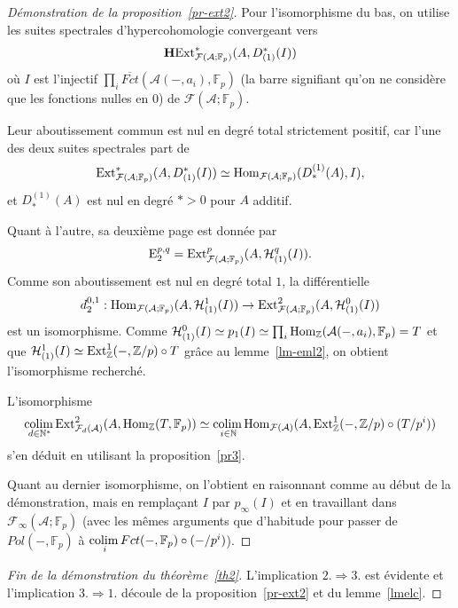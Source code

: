 \documentclass[a4paper,10pt]{article}
\newcommand{\A}{{\mathcal{A}}}
\newcommand{\F}{{\mathcal{F}}}
\newcommand{\Hh}{{\mathcal{H}}}
\newcommand{\col}{{\rm colim}\,}
\theoremstyle{definition}
\theoremstyle{remark}
\begin{document}
\begin{proof}[Démonstration de la proposition~\ref{pr-ext2}]
 Pour l'isomorphisme du bas, on utilise les suites spectrales d'hypercohomologie convergeant vers
$$\mathbf{H}{\rm Ext}^*_{\F(\A;\mathbb{F}_p)}(A,D^*_{(1)}(I))$$
où $I$ est l'injectif $\prod_i \overline{Fct}(\A(-,a_i),\mathbb{F}_p)$ (la barre signifiant qu'on ne considère que les fonctions nulles en $0$) de $\F(\A;\mathbb{F}_p)$.

Leur aboutissement commun est nul en degré total strictement positif, car l'une des deux suites spectrales part de
$${\rm Ext}^*_{\F(\A;\mathbb{F}_p)}(A,D^*_{(1)}(I))\simeq {\rm Hom}_{\F(\A;\mathbb{F}_p)}(D_*^{(1)}(A),I),$$
et $D_*^{(1)}(A)$ est nul en degré $*>0$ pour $A$ additif.

Quant à l'autre, sa deuxième page est donnée par
$${\rm E}_2^{p,q}={\rm Ext}^p_{\F(\A;\mathbb{F}_p)}(A,\Hh^q_{(1)}(I)).$$
Comme son aboutissement est nul en degré total $1$, la différentielle
$$d_2^{0,1} : {\rm Hom}_{\F(\A;\mathbb{F}_p)}(A,\Hh^1_{(1)}(I))\to{\rm Ext}^2_{\F(\A;\mathbb{F}_p)}(A,\Hh^0_{(1)}(I))$$
est un isomorphisme. Comme $\Hh^0_{(1)}(I)\simeq p_1(I)\simeq\prod_i {\rm Hom}_\mathbb{Z}(\A(-,a_i),\mathbb{F}_p)=T$ et que $\Hh^1_{(1)}(I)\simeq {\rm Ext}^1_\mathbb{Z}(-,\mathbb{Z}/p)\circ T$ grâce au lemme~\ref{lm-eml2}, on obtient l'isomorphisme recherché.

L'isomorphisme
$$\underset{d\in\mathbb{N}^*}{\col}{\rm Ext}^2_{\F_d(\A)}(A,{\rm Hom}_\mathbb{Z}(T,\mathbb{F}_p))\simeq\underset{i\in\mathbb{N}}{\col}{\rm Hom}_{\F(\A)}(A,{\rm Ext}^1_\mathbb{Z}(-,\mathbb{Z}/p)\circ (T/p^i))$$
s'en déduit en utilisant la proposition~\ref{pr3}.

Quant au dernier isomorphisme, on l'obtient en raisonnant comme au début de la démonstration, mais en remplaçant $I$ par $p_\infty(I)$ et en travaillant dans $\F_\infty(\A;\mathbb{F}_p)$ (avec les mêmes arguments que d'habitude pour passer de $Pol(-,\mathbb{F}_p)$ à $\underset{i}{\col}Fct(-,\mathbb{F}_p)\circ (-/p^i)$).
\end{proof}

\begin{proof}[Fin de la démonstration du théorème~\ref{th2}]
 L'implication $2.\Rightarrow 3.$ est évidente et l'implication $3.\Rightarrow 1.$ découle de la proposition~\ref{pr-ext2} et du lemme~\ref{lmelc}. 
\end{proof}
\end{document}
